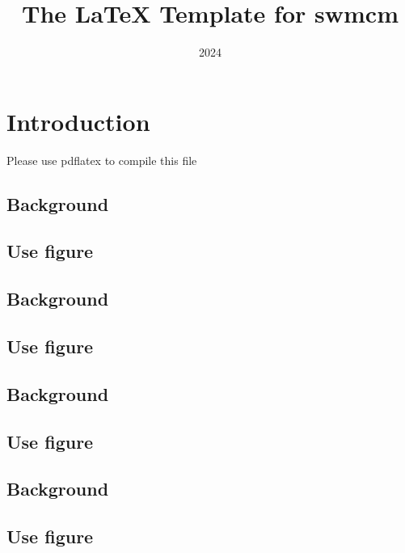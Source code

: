 \documentclass{swmcmthesis}
\title{The \LaTeX{} Template  for swmcm} %
\date{2024}
\begin{document}
\maketitle
\tableofcontents

\newpage

\section{Introduction}
\lipsum[1]

\begin{center}
{{\Huge Please use pdflatex to compile this file}}
\end{center}

\subsection{Background}
\lipsum[1-2]

\subsection{Use figure}
\lipsum[1-2]

\subsection{Background}
\lipsum[1-2]

\subsection{Use figure}
\lipsum[1-2]

\subsection{Background}
\lipsum[1-2]

\subsection{Use figure}
\lipsum[1-2]
\subsection{Background}
\lipsum[1-2]

\subsection{Use figure}
\lipsum[1-2]
\end{document}
